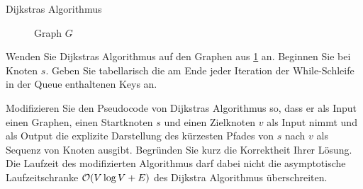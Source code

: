 \documentclass{article}
\begin{document}
\begin{eexercises}{Dijkstras Algorithmus}{
    \begin{figure}[ht]
      \centering


      \caption{Graph $G$}\label{fig:dijkstra}
    \end{figure}
  }
  \item Wenden Sie Dijkstras Algorithmus auf den Graphen aus \ref{fig:dijkstra} an. Beginnen Sie bei Knoten $s$. Geben Sie tabellarisch die am Ende jeder Iteration der While-Schleife in der Queue enthaltenen Keys an.
  \item Modifizieren Sie den Pseudocode von Dijkstras Algorithmus so, dass er als Input einen Graphen, einen Startknoten $s$ und einen Zielknoten $v$ als Input nimmt und als Output die explizite Darstellung des kürzesten Pfades von $s$ nach $v$ als Sequenz von Knoten ausgibt. Begründen Sie kurz die Korrektheit Ihrer Lösung. Die Laufzeit des modifizierten Algorithmus darf dabei nicht die asymptotische Laufzeitschranke $\mathcal{O}(V \log V + E)$ des Dijkstra Algorithmus überschreiten.
\end{eexercises}
\end{document}
